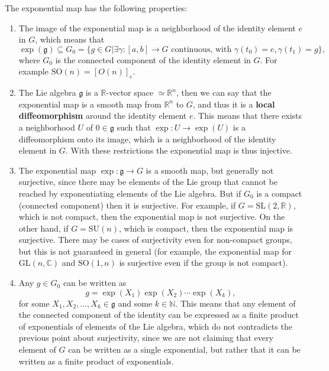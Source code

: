 \begin{proposition}
    The exponential map has the following properties:
    \begin{enumerate}
        \item The image of the exponential map is a neighborhood of the identity element \(e\) in \(G\), which means that
              \[
                  \exp(\mathfrak{g}) \subseteq G_0 = \{g \in G | \exists \gamma : [a,b] \to G \text{ continuous, with } \gamma(t_0) = e, \gamma(t_1) = g\},
              \]
              where \(G_0\) is the connected component of the identity element in \(G\). For example \(\mathrm{SO}(n) = [O(n)]_e\).
        \item The Lie algebra \(\mathfrak{g}\) is a \(\mathbb{R}\)-vector space \(\simeq \mathbb{R}^n\), then we can say that the exponential map is a smooth map from \(\mathbb{R}^n\) to \(G\), and thus it is a \textbf{local diffeomorphism} around the identity element \(e\). This means that there exists a neighborhood \(U\) of \(0 \in \mathfrak{g}\) such that \(\exp : U \to \exp(U)\) is a diffeomorphism onto its image, which is a neighborhood of the identity element in \(G\). With these restrictions the exponential map is thus injective.
        \item The exponential map \(\exp : \mathfrak{g} \to G\) is a smooth map, but generally not surjective, since there may be elements of the Lie group that cannot be reached by exponentiating elements of the Lie algebra. But if \(G_0\) is a compact (connected component) then it is surjective. For example, if \(G = \mathrm{SL}(2, \mathbb{R})\), which is not compact, then the exponential map is not surjective. On the other hand, if \(G = \mathrm{SU}(n)\), which is compact, then the exponential map is surjective. There may be cases of surjectivity even for non-compact groups, but this is not guaranteed in general (for example, the exponential map for \(\mathrm{GL}(n,\mathbb{C})\) and \(\mathrm{SO}(1,n)\) is surjective even if the group is not compact).
        \item Any \(g \in G_0\) can be written as
              \[
                  g = \exp(X_1) \exp(X_2) \cdots \exp(X_k),
              \]
              for some \(X_1, X_2, \ldots, X_k \in \mathfrak{g}\) and some \(k \in \mathbb{N}\). This means that any element of the connected component of the identity can be expressed as a finite product of exponentials of elements of the Lie algebra, which do not contradicts the previous point about surjectivity, since we are not claiming that every element of \(G\) can be written as a single exponential, but rather that it can be written as a finite product of exponentials.

\end{enumerate}
\end{proposition}
